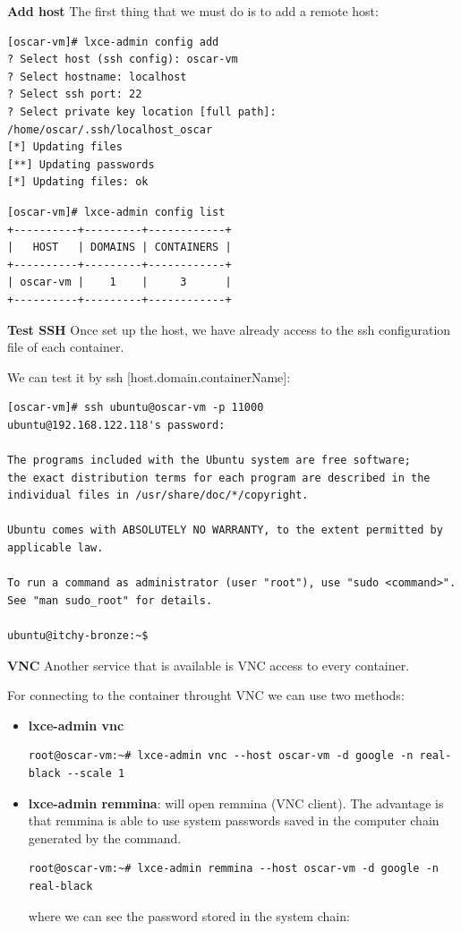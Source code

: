 \textbf{Add host}
The first thing that we must do is to add a remote host:
\begin{verbatim}
[oscar-vm]# lxce-admin config add
? Select host (ssh config): oscar-vm
? Select hostname: localhost
? Select ssh port: 22
? Select private key location [full path]: /home/oscar/.ssh/localhost_oscar
[*] Updating files
[**] Updating passwords
[*] Updating files: ok
\end{verbatim}

\begin{verbatim}
[oscar-vm]# lxce-admin config list                                                                 
+----------+---------+------------+
|   HOST   | DOMAINS | CONTAINERS |
+----------+---------+------------+
| oscar-vm |    1    |     3      |
+----------+---------+------------+
\end{verbatim}

\textbf{Test SSH}
Once set up the host, we have already access to the ssh configuration file of each container.

We can test it by ssh [host.domain.containerName]:
\begin{verbatim}
[oscar-vm]# ssh ubuntu@oscar-vm -p 11000           
ubuntu@192.168.122.118's password:

The programs included with the Ubuntu system are free software;
the exact distribution terms for each program are described in the
individual files in /usr/share/doc/*/copyright.

Ubuntu comes with ABSOLUTELY NO WARRANTY, to the extent permitted by
applicable law.

To run a command as administrator (user "root"), use "sudo <command>".
See "man sudo_root" for details.

ubuntu@itchy-bronze:~$
\end{verbatim}

\textbf{VNC}
Another service that is available is VNC access to every container.

For connecting to the container throught VNC we can use two methods:
\begin{itemize}
	\item{\textbf{lxce-admin vnc}}
\begin{verbatim}
root@oscar-vm:~# lxce-admin vnc --host oscar-vm -d google -n real-black --scale 1
\end{verbatim}
	\item{\textbf{lxce-admin remmina}: will open remmina (VNC client). The advantage is that remmina is able to use system passwords saved in the computer chain generated by the command.}
\begin{verbatim}
root@oscar-vm:~# lxce-admin remmina --host oscar-vm -d google -n real-black
\end{verbatim}
where we can see the password stored in the system chain:
\end{itemize}










